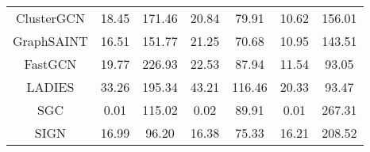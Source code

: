 \message{ !name(main.tex)}\documentclass{article}
\begin{document}
\begin{table}[!ht]
{\begin{tabular}{ccccccc}
			ClusterGCN                                                     & 18.45                                                   & 171.46                                                            & 20.84                                                  & 79.91                                                             & 10.62                                                  & 156.01                                                            \\
			GraphSAINT                                                     & 16.51                                                   & 151.77                                                            & 21.25                                                  & 70.68                                                             & 10.95                                                  & 143.51                                                            \\
			FastGCN                                                        & 19.77                                                   & 226.93                                                            & 22.53                                                  & 87.94                                                             & 11.54                                                  & 93.05                                                             \\
			LADIES                                                         & 33.26                                                   & 195.34                                                            & 43.21                                                  & 116.46                                                            & 20.33                                                  & 93.47                                                             \\
			\hline
			SGC                                                            & 0.01                                                    & 115.02                                                            & 0.02                                                   & 89.91                                                             & 0.01                                                   & 267.31                                                            \\
			SIGN                                                           & 16.99                                                   & 96.20                                                             & 16.38                                                  & 75.33                                                             & 16.21                                                  & 208.52                                                            \\

\end{tabular}}
\end{table}
\end{document}
